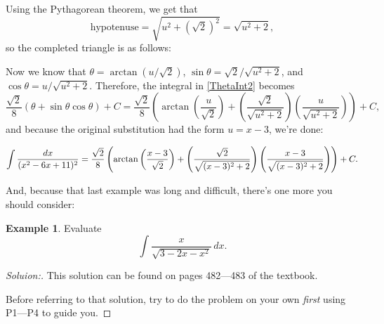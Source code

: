 \documentclass[12pt]{article}
\theoremstyle{definition}
\newtheorem{ex}{Example}
\newcommand{\sol}[1]{\begin{proof}[Soluion:]#1\end{proof}}
\newcommand{\hyp}{\text{hypotenuse}}
\newcommand{\eqbox}[1]{\begin{tcolorbox}
	[colback=white,colframe=gray,boxrule=0.5pt,arc=0pt,top=3mm,bottom=3mm]#1\end{tcolorbox}\vspace{3mm}}
\begin{document}
{\begin{enumerate}[label=P\arabic*.,leftmargin=0.75in]
		\begin{center}
		\end{center}
	
		Using the Pythagorean theorem, we get that
		$$\hyp=\sqrt{u^2+(\sqrt{2})^2}=\sqrt{u^2+2},$$
		so the completed triangle is as follows:
	
		\begin{center}
		\end{center}
	
		Now we know that $\theta=\arctan(u/\sqrt{2})$, $\sin\theta=\sqrt{2}/\sqrt{u^2+2}$, and $\cos\theta=u/\sqrt{u^2+2}$. Therefore, the integral in \eqref{ThetaInt2} becomes
		$$\frac{\sqrt{2}}{8}\left(\theta+\sin\theta\cos\theta\right)+C=\frac{\sqrt{2}}{8}\left(\arctan\left(\frac{u}{\sqrt{2}}\right)+\left(\frac{\sqrt{2}}{\sqrt{u^2+2}}\right)\left(\frac{u}{\sqrt{u^2+2}}\right)\right)+C,$$
		and because the original substitution had the form $u=x-3$, we're done:
	\end{enumerate}

	\eqbox{$$\int\frac{dx}{(x^2-6x+11)^2}=\frac{\sqrt{2}}{8}\left(\arctan\left(\frac{x-3}{\sqrt{2}}\right)+\left(\frac{\sqrt{2}}{\sqrt{(x-3)^2+2}}\right)\left(\frac{x-3}{\sqrt{(x-3)^2+2}}\right)\right)+C.\qedhere$$}}

	And, because that last example was long and difficult, there's one more you should consider:
	
	\begin{ex}
		Evaluate $$\int\frac{x}{\sqrt{3-2x-x^2}}\,dx.$$
	\end{ex}
	\sol{This solution can be found on pages 482---483 of the textbook.
	
	Before referring to that solution, try to do the problem on your own \textit{first} using P1---P4 to guide you.}
\end{document}
